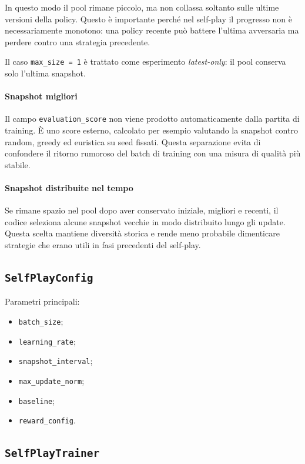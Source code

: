 \documentclass[11pt,a4paper]{article}
\begin{document}
In questo modo il pool rimane piccolo, ma non collassa soltanto sulle ultime
versioni della policy. Questo è importante perché nel self-play il progresso
non è necessariamente monotono: una policy recente può battere l'ultima
avversaria ma perdere contro una strategia precedente.

Il caso \texttt{max\_size = 1} è trattato come esperimento \emph{latest-only}:
il pool conserva solo l'ultima snapshot.

\paragraph{Snapshot migliori}
Il campo \texttt{evaluation\_score} non viene prodotto automaticamente dalla
partita di training. È uno score esterno, calcolato per esempio valutando la
snapshot contro random, greedy ed euristica su seed fissati. Questa separazione
evita di confondere il ritorno rumoroso del batch di training con una misura
di qualità più stabile.

\paragraph{Snapshot distribuite nel tempo}
Se rimane spazio nel pool dopo aver conservato iniziale, migliori e recenti, il
codice seleziona alcune snapshot vecchie in modo distribuito lungo gli update.
Questa scelta mantiene diversità storica e rende meno probabile dimenticare
strategie che erano utili in fasi precedenti del self-play.

\subsection{\texttt{SelfPlayConfig}}

Parametri principali:

\begin{itemize}
  \item \texttt{batch\_size};
  \item \texttt{learning\_rate};
  \item \texttt{snapshot\_interval};
  \item \texttt{max\_update\_norm};
  \item \texttt{baseline};
  \item \texttt{reward\_config}.
\end{itemize}

\subsection{\texttt{SelfPlayTrainer}}
\end{document}

